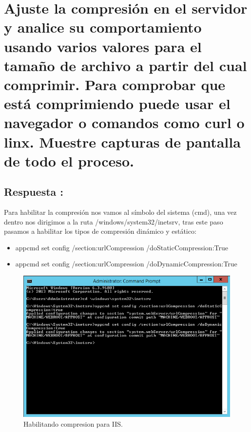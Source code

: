 \section{Ajuste la compresión en el servidor y analice su comportamiento usando varios valores para el tamaño de archivo a partir del cual comprimir. Para comprobar que está comprimiendo puede usar el navegador o comandos como curl o linx. Muestre capturas de pantalla de todo el proceso.}
\subsection{Respuesta : }

Para habilitar la compresión nos vamos al símbolo del sistema (cmd), una vez dentro nos dirigimos a la ruta /windows/system32/inetsrv, tras este paso pasamos a habilitar los tipos de compresión dinámico y estático: \cite{HABILITARCOMPRESION}

\begin{itemize}
	\item appcmd set config /section:urlCompression /doStaticCompression:True
	\item appcmd set config /section:urlCompression /doDynamicCompression:True
\end{itemize} 

\begin{figure}[H]
	\begin{center}
		\includegraphics[width=15cm]{Imagenes/Activacion_compresion_statica_dinamica}
		\caption{Habilitando compresion para IIS.}
		\label{fig:23}
	\end{center}
\end{figure}

